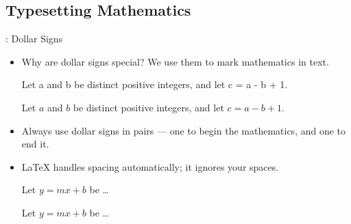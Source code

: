 \documentclass{beamer}
\begin{document}





\subsection{Typesetting Mathematics}
\begin{frame}[fragile]{\insertsubsection{}: Dollar Signs}
\begin{itemize}
\item Why are dollar signs \keystrokebftt{\$} special? We use them to mark mathematics in text.\\[1ex]
\begin{exampletwouptiny}
Let a and b be distinct positive
integers, and let c = a - b + 1.

Let $a$ and $b$ be distinct positive
integers, and let $c = a - b + 1$.
\end{exampletwouptiny}
\item Always use dollar signs in pairs --- one to begin the mathematics, and one
to end it.
\item \LaTeX{} handles spacing automatically; it ignores your spaces.
\begin{exampletwouptiny}
Let $y=mx+b$ be \ldots

Let $y = m x + b$ be \ldots
\end{exampletwouptiny}
\end{itemize}
\end{frame}
\end{document}
